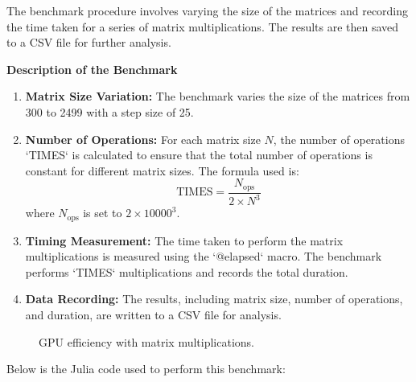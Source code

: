 The benchmark procedure involves varying the size of the matrices and recording the time taken for a series of matrix multiplications. The results are then saved to a CSV file for further analysis.

\begin{center}
   \textbf{Description of the Benchmark}   
\end{center}

\begin{enumerate}
   \item \textbf{Matrix Size Variation:} The benchmark varies the size of the matrices from 300 to 2499 with a step size of 25.
   \item \textbf{Number of Operations:} For each matrix size \(N\), the number of operations `TIMES` is calculated to ensure that the total number of operations is constant for different matrix sizes. The formula used is:
   \[
   \text{TIMES} = \frac{N_{\text{ops}}}{2 \times N^3}
   \]
 where \(N_{\text{ops}}\) is set to \(2 \times 10000^3\).
   \item \textbf{Timing Measurement:} The time taken to perform the matrix multiplications is measured using the `@elapsed` macro. The benchmark performs `TIMES` multiplications and records the total duration.
   \item \textbf{Data Recording:} The results, including matrix size, number of operations, and duration, are written to a CSV file for analysis.
\end{enumerate}

\begin{figure}[h]
   \begin{center}
       
  \end{center}
  \caption{GPU efficiency with matrix multiplications.}
  \label{}
\end{figure}
\newpage


Below is the Julia code used to perform this benchmark:

\begin{comment}

\end{comment}

